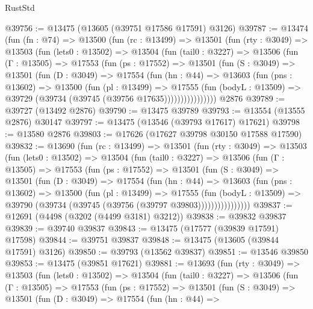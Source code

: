 \begin{lexlean}{RustStd}
\begin{coremodule}
@39756 := @13475 (@13605 (@39751 @17586 @17591) @3126)
@39787 := @13474
    (fun (fn : @74) =>
    @13500
      (fun (rc : @13499) =>
      @13501
        (fun (rty : @3049) =>
        @13503
          (fun (lets0 : @13502) =>
          @13504
            (fun (tail0 : @3227) =>
            @13506
              (fun (Γ : @13505) =>
              @17553
                (fun (ps : @17552) =>
                @13501
                  (fun (S : @3049) =>
                  @13501
                    (fun (D : @3049) =>
                    @17554
                      (fun (hn : @44) =>
                      @13603
                        (fun (pns : @13602) =>
                        @13500
                          (fun (pl : @13499) =>
                          @17555
                            (fun (bodyL : @13509) =>
                            @39729 (@39734 (@39745 (@39756 @17635))))))))))))))))
    @2876
@39789 := @39727 (@13492 @2876)
@39790 := @13475 @39789
@39793 := @13554 (@13555 @2876) @30147
@39797 := @13475 (@13546 (@39793 @17617) @17621)
@39798 := @13580 @2876
@39803 := @17626 (@17627 @39798 @30150 @17588 @17590)
@39832 := @13690
    (fun (rc : @13499) =>
    @13501
      (fun (rty : @3049) =>
      @13503
        (fun (lets0 : @13502) =>
        @13504
          (fun (tail0 : @3227) =>
          @13506
            (fun (Γ : @13505) =>
            @17553
              (fun (ps : @17552) =>
              @13501
                (fun (S : @3049) =>
                @13501
                  (fun (D : @3049) =>
                  @17554
                    (fun (hn : @44) =>
                    @13603
                      (fun (pns : @13602) =>
                      @13500
                        (fun (pl : @13499) =>
                        @17555
                          (fun (bodyL : @13509) =>
                          @39790 (@39734 (@39745 (@39756 (@39797 @39803))))))))))))))))
@39837 := @12691 (@4498 (@3202 (@4499 @3181) @3212))
@39838 := @39832 @39837
@39839 := @39740 @39837
@39843 := @13475 (@17577 (@39839 @17591) @17598)
@39844 := @39751 @39837
@39848 := @13475 (@13605 (@39844 @17591) @3126)
@39850 := @39793 (@13562 @39837)
@39851 := @13546 @39850
@39853 := @13475 (@39851 @17621)
@39881 := @13693
    (fun (rty : @3049) =>
    @13503
      (fun (lets0 : @13502) =>
      @13504
        (fun (tail0 : @3227) =>
        @13506
          (fun (Γ : @13505) =>
          @17553
            (fun (ps : @17552) =>
            @13501
              (fun (S : @3049) =>
              @13501
                (fun (D : @3049) =>
                @17554
                  (fun (hn : @44) =>

\end{coremodule}
\end{lexlean}
